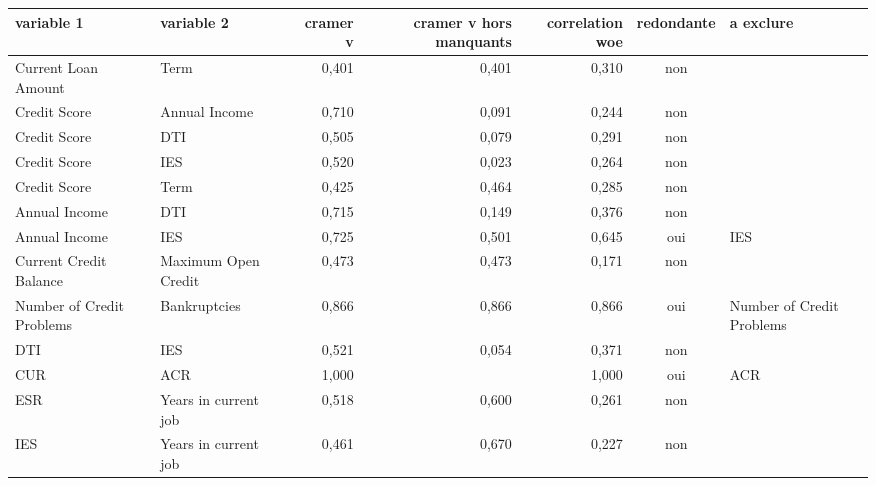 \begin{tabular}{llrrrcl}
\toprule
\textbf{variable 1} & \textbf{variable 2} & \textbf{cramer v} & \textbf{cramer v hors manquants} & \textbf{correlation woe} & \textbf{redondante} & \textbf{a exclure} \\
\midrule
Current Loan Amount & Term & 0,401 & 0,401 & 0,310 & non &  \\
Credit Score & Annual Income & 0,710 & 0,091 & 0,244 & non &  \\
Credit Score & DTI & 0,505 & 0,079 & 0,291 & non &  \\
Credit Score & IES & 0,520 & 0,023 & 0,264 & non &  \\
Credit Score & Term & 0,425 & 0,464 & 0,285 & non &  \\
Annual Income & DTI & 0,715 & 0,149 & 0,376 & non &  \\
Annual Income & IES & 0,725 & 0,501 & 0,645 & oui & IES \\
Current Credit Balance & Maximum Open Credit & 0,473 & 0,473 & 0,171 & non &  \\
Number of Credit Problems & Bankruptcies & 0,866 & 0,866 & 0,866 & oui & Number of Credit Problems \\
DTI & IES & 0,521 & 0,054 & 0,371 & non &  \\
CUR & ACR & 1,000 &  & 1,000 & oui & ACR \\
ESR & Years in current job & 0,518 & 0,600 & 0,261 & non &  \\
IES & Years in current job & 0,461 & 0,670 & 0,227 & non &  \\
\bottomrule
\end{tabular}
